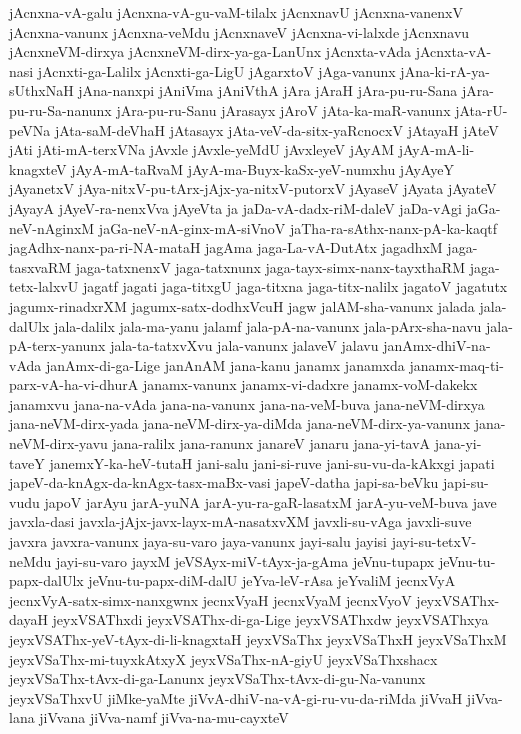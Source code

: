 {jAcnxna-vA-galu
jAcnxna-vA-gu-vaM-tilalx
jAcnxnavU
jAcnxna-vanenxV
jAcnxna-vanunx
jAcnxna-veMdu
jAcnxnaveV
jAcnxna-vi-lalxde
jAcnxnavu
jAcnxneVM-dirxya
jAcnxneVM-dirx-ya-ga-LanUnx
jAcnxta-vAda
jAcnxta-vA-nasi
jAcnxti-ga-Lalilx
jAcnxti-ga-LigU
jAgarxtoV
jAga-vanunx
jAna-ki-rA-ya-sUthxNaH
jAna-nanxpi
jAniVma
jAniVthA
jAra
jAraH
jAra-pu-ru-Sana
jAra-pu-ru-Sa-nanunx
jAra-pu-ru-Sanu
jArasayx
jAroV
jAta-ka-maR-vanunx
jAta-rU-peVNa
jAta-saM-deVhaH
jAtasayx
jAta-veV-da-sitx-yaRcnocxV
jAtayaH
jAteV
jAti
jAti-mA-terxVNa
jAvxle
jAvxle-yeMdU
jAvxleyeV
jAyAM
jAyA-mA-li-knagxteV
jAyA-mA-taRvaM
jAyA-ma-Buyx-kaSx-yeV-numxhu
jAyAyeY
jAyanetxV
jAya-nitxV-pu-tArx-jAjx-ya-nitxV-putorxV
jAyaseV
jAyata
jAyateV
jAyayA
jAyeV-ra-nenxVva
jAyeVta
ja
jaDa-vA-dadx-riM-daleV
jaDa-vAgi
jaGa-neV-nAginxM
jaGa-neV-nA-ginx-mA-siVnoV
jaTha-ra-sAthx-nanx-pA-ka-kaqtf
jagAdhx-nanx-pa-ri-NA-mataH
jagAma
jaga-La-vA-DutAtx
jagadhxM
jaga-tasxvaRM
jaga-tatxnenxV
jaga-tatxnunx
jaga-tayx-simx-nanx-tayxthaRM
jaga-tetx-lalxvU
jagatf
jagati
jaga-titxgU
jaga-titxna
jaga-titx-nalilx
jagatoV
jagatutx
jagumx-rinadxrXM
jagumx-satx-dodhxVcuH
jagw
jalAM-sha-vanunx
jalada
jala-dalUlx
jala-dalilx
jala-ma-yanu
jalamf
jala-pA-na-vanunx
jala-pArx-sha-navu
jala-pA-terx-yanunx
jala-ta-tatxvXvu
jala-vanunx
jalaveV
jalavu
janAmx-dhiV-na-vAda
janAmx-di-ga-Lige
janAnAM
jana-kanu
janamx
janamxda
janamx-maq-ti-parx-vA-ha-vi-dhurA
janamx-vanunx
janamx-vi-dadxre
janamx-voM-dakekx
janamxvu
jana-na-vAda
jana-na-vanunx
jana-na-veM-buva
jana-neVM-dirxya
jana-neVM-dirx-yada
jana-neVM-dirx-ya-diMda
jana-neVM-dirx-ya-vanunx
jana-neVM-dirx-yavu
jana-ralilx
jana-ranunx
janareV
janaru
jana-yi-tavA
jana-yi-taveY
janemxY-ka-heV-tutaH
jani-salu
jani-si-ruve
jani-su-vu-da-kAkxgi
japati
japeV-da-knAgx-da-knAgx-tasx-maBx-vasi
japeV-datha
japi-sa-beVku
japi-su-vudu
japoV
jarAyu
jarA-yuNA
jarA-yu-ra-gaR-lasatxM
jarA-yu-veM-buva
jave
javxla-dasi
javxla-jAjx-javx-layx-mA-nasatxvXM
javxli-su-vAga
javxli-suve
javxra
javxra-vanunx
jaya-su-varo
jaya-vanunx
jayi-salu
jayisi
jayi-su-tetxV-neMdu
jayi-su-varo
jayxM
jeVSAyx-miV-tAyx-ja-gAma
jeVnu-tupapx
jeVnu-tu-papx-dalUlx
jeVnu-tu-papx-diM-dalU
jeYva-leV-rAsa
jeYvaliM
jecnxVyA
jecnxVyA-satx-simx-nanxgwnx
jecnxVyaH
jecnxVyaM
jecnxVyoV
jeyxVSAThx-dayaH
jeyxVSAThxdi
jeyxVSAThx-di-ga-Lige
jeyxVSAThxdw
jeyxVSAThxya
jeyxVSAThx-yeV-tAyx-di-li-knagxtaH
jeyxVSaThx
jeyxVSaThxH
jeyxVSaThxM
jeyxVSaThx-mi-tuyxkAtxyX
jeyxVSaThx-nA-giyU
jeyxVSaThxshacx
jeyxVSaThx-tAvx-di-ga-Lanunx
jeyxVSaThx-tAvx-di-gu-Na-vanunx
jeyxVSaThxvU
jiMke-yaMte
jiVvA-dhiV-na-vA-gi-ru-vu-da-riMda
jiVvaH
jiVva-lana
jiVvana
jiVva-namf
jiVva-na-mu-cayxteV
}
